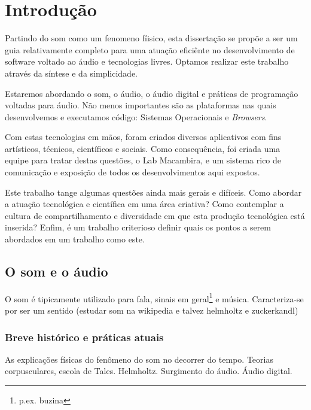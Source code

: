 \chapter{Introdução} %
\label{cap:intro} %
Partindo do som como um fenomeno fíisico, esta dissertação se propõe a ser um guia relativamente 
completo para uma atuação eficiênte no desenvolvimento
de software voltado ao áudio e tecnologias livres. Optamos
realizar este trabalho através da síntese e da simplicidade. 

Estaremos abordando o som, o áudio, o áudio digital e práticas de programação voltadas para
áudio. Não menos importantes são as plataformas nas quais desenvolvemos e executamos código:
Sistemas Operacionais e \emph{Browsers}.

Com estas tecnologias em mãos, foram criados diversos aplicativos com fins artísticos,
técnicos, científicos e sociais. Como consequência, foi criada uma equipe para tratar
destas questões, o Lab Macambira, e um sistema rico de comunicação e exposição de todos
os desenvolvimentos aqui expostos.

Este trabalho tange algumas questões ainda mais gerais e difíceis.
Como abordar a atuação tecnológica e científica em uma área criativa? Como contemplar
a cultura de compartilhamento e diversidade em que esta produção tecnológica está inserida?
Enfim, é um trabalho criterioso definir quais os pontos a serem abordados em um trabalho como este.


\section{O som e o áudio}
O som é tipicamente utilizado para fala, sinais em geral\footnote{p.ex. buzina} e música.
Caracteriza-se por ser um sentido (estudar som na wikipedia e talvez helmholtz e zuckerkandl)


  \subsection{Breve histórico e práticas atuais}
As explicações físicas do fenômeno do som no decorrer do tempo. Teorias
corpusculares, escola de Tales. Helmholtz. Surgimento do áudio. Áudio digital.


